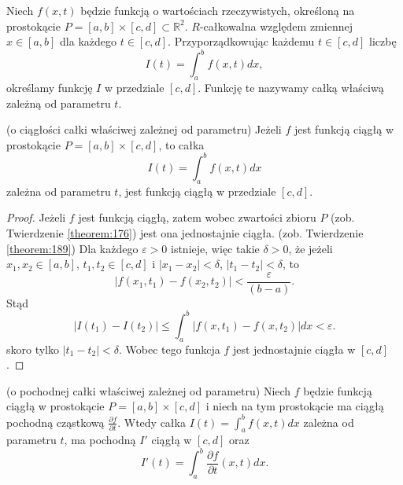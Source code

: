 \documentclass[leqno]{article}
\begin{document}
\begin{justify}
\begin{defn}
    Niech $f(x,t)$ będzie funkcją o wartościach rzeczywistych, określoną na prostokącie $P = [a,b] \times [c,d] \subset \mathbb{R}^2$. $R$-całkowalna względem zmiennej $x \in [a,b]$ dla
    każdego $t \in [c,d]$. Przyporządkowując każdemu $t \in [c,d]$ liczbę 
    \[
        I(t) = \int_{a}^{b}f(x,t)dx,
    \]
    określamy funkcję $I$ w przedziale $[c,d]$. Funkcję te nazywamy całką właściwą zależną od parametru $t$.
\end{defn}

\begin{theorem}
{
    (o ciągłości całki właściwej zależnej od parametru) Jeżeli $f$ jest funkcją ciągłą w prostokącie $P = [a,b] \times [c,d]$, to całka 
    \[
        I(t) = \int_{a}^{b}f(x,t)dx
    \]
    zależna od parametru $t$, jest funkcją ciągłą w przedziale $[c,d]$.
}
\end{theorem}

\begin{proof}
    Jeżeli $f$ jest funkcją ciągłą, zatem wobec zwartości zbioru $P$ (zob. Twierdzenie \ref{theorem:176}) jest ona jednostajnie ciągła. (zob. Twierdzenie \ref{theorem:189})
    Dla każdego $\varepsilon > 0$ istnieje, więc takie $\delta > 0$, że jeżeli $x_1, x_2 \in [a,b]$, $t_1,t_2 \in [c,d]$ i $|x_1 - x_2| < \delta$, $|t_1 - t_2| < \delta$, to 
    \[
        |f(x_1, t_1) - f(x_2, t_2)| < \frac{\varepsilon}{(b-a)}.
    \]
    Stąd 
    \[
        |I(t_1) - I(t_2)| \leqslant \int_{a}^{b}|f(x, t_1) - f(x, t_2)|dx < \varepsilon.
    \]
    skoro tylko $|t_1 - t_2| < \delta$. Wobec tego funkcja $f$ jest jednostajnie ciągła w $[c,d]$.
\end{proof}

\begin{theorem}
{
    (o pochodnej całki właściwej zależnej od parametru) Niech $f$ będzie funkcją ciągłą w prostokącie $P = [a,b] \times [c,d]$ i niech 
    na tym prostokącie ma ciągłą pochodną cząstkową $\frac{\partial f}{\partial t}$.
    Wtedy całka $I(t) = \int_{a}^{b}f(x,t)dx$ zależna od parametru $t$, ma pochodną $I'$ ciągłą w $[c,d]$ oraz 
    \[
        I'(t) = \int_{a}^{b}\frac{\partial f}{\partial t}(x,t)dx.
    \]
}
\end{theorem}


\end{justify}
\end{document}
